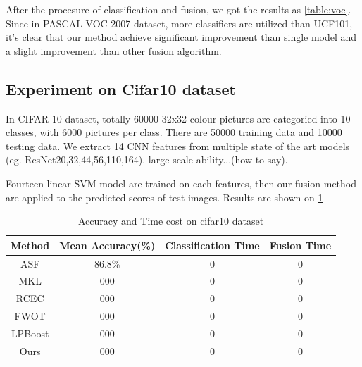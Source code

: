 \documentclass[letterpaper]{article}
\begin{document}
After the procesure of classification and fusion, we got the results as \ref{table:voc}. Since in PASCAL VOC 2007 dataset, more classifiers are utilized than UCF101, it's clear that our method achieve significant improvement than single model and a slight improvement than other fusion algorithm.



\subsection{Experiment on Cifar10 dataset}
In CIFAR-10 dataset, totally 60000 32x32 colour pictures are categoried into 10 classes, with 6000 pictures per class. There are 50000 training data and 10000 testing data. We extract 14 CNN features from multiple state of the art models (eg. ResNet20,32,44,56,110,164). large scale ability...(how to say).

Fourteen linear SVM model are trained on each features, then our fusion method are applied to the predicted scores of test images. Results are shown on \ref{table:cifar10}


\begin{table}[h]\scriptsize
\centering
\label{table:cifar10}
\begin{tabular}{c|c|c|c}
\hline
Method & Mean Accuracy(\%) & Classification Time & Fusion Time\\\hline
ASF &  86.8\% & 0 & 0 \\
MKL &  000 & 0 & 0 \\
RCEC &  000 & 0 & 0 \\
FWOT &  000 & 0 & 0 \\
LPBoost & 000 & 0 & 0 \\\hline
Ours &  000 & 0 & 0 \\
\hline
\end{tabular}
\caption{Accuracy and Time cost on cifar10 dataset}
\end{table}



\begin{quote}
\begin{small}
  
  
\end{small}
\end{quote}
\end{document}

